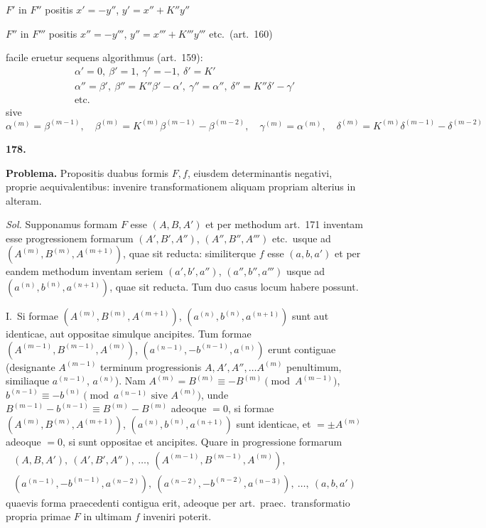 \documentclass[12pt,a4paper]{article}
\theoremstyle{plain}
\theoremstyle{definition}
\theoremstyle{remark}
\begin{document}
$F'$ in $F''$ positis $x'=-y''$, $y'=x''+K''y''$

$F''$ in $F'''$ positis $x''=-y'''$, $y''=x'''+K'''y'''$ etc.\ (art.\ 160)

facile eruetur sequens algorithmus (art.\ 159):
\begin{gather*}
\alpha'=0,\ \beta'=1,\ \gamma'=-1,\ \delta'=K'\\
\alpha''=\beta',\ \beta''=K''\beta'-\alpha',\ \gamma''=\alpha'',\ \delta''=K''\delta'-\gamma'\\
\text{etc.}
\end{gather*}
sive
\[\alpha^{(m)}=\beta^{(m-1)},\quad \beta^{(m)}=K^{(m)}\beta^{(m-1)}-\beta^{(m-2)},\quad \gamma^{(m)}=\alpha^{(m)},\quad \delta^{(m)}=K^{(m)}\delta^{(m-1)}-\delta^{(m-2)}\]

\textbf{178.}

\textbf{Problema.} Propositis duabus formis $F,f$, eiusdem determinantis negativi, proprie aequivalentibus: invenire transformationem aliquam propriam alterius in alteram.

\textit{Sol.} Supponamus formam $F$ esse $(A,B,A')$ et per methodum art.\ 171 inventam esse progressionem formarum $(A',B',A'')$, $(A'',B'',A''')$ etc.\ usque ad $(A^{(m)},B^{(m)},A^{(m+1)})$, quae sit reducta: similiterque $f$ esse $(a,b,a')$ et per eandem methodum inventam seriem $(a',b',a'')$, $(a'',b'',a''')$ usque ad $(a^{(n)},b^{(n)},a^{(n+1)})$, quae sit reducta. Tum duo casus locum habere possunt.

I.\ Si formae $(A^{(m)},B^{(m)},A^{(m+1)})$, $(a^{(n)},b^{(n)},a^{(n+1)})$ sunt aut identicae, aut oppositae simulque ancipites. Tum formae $(A^{(m-1)},B^{(m-1)},A^{(m)})$, $(a^{(n-1)},-b^{(n-1)},a^{(n)})$ erunt contiguae (designante $A^{(m-1)}$ terminum progressionis $A,A',A'',\ldots A^{(m)}$ penultimum, similiaque $a^{(n-1)}$, $a^{(n)}$). Nam $A^{(m)}=B^{(m)}\equiv -B^{(m)}\pmod{A^{(m-1)}}$, $b^{(n-1)}\equiv -b^{(n)}\pmod{a^{(n-1)}\text{ sive }A^{(m)}}$, unde $B^{(m-1)}-b^{(n-1)}\equiv B^{(m)}-B^{(m)}$ adeoque $=0$, si formae $(A^{(m)},B^{(m)},A^{(m+1)})$, $(a^{(n)},b^{(n)},a^{(n+1)})$ sunt identicae, et $=\pm A^{(m)}$ adeoque $=0$, si sunt oppositae et ancipites. Quare in progressione formarum
\begin{gather*}
(A,B,A'),\ (A',B',A''),\ \ldots,\ (A^{(m-1)},B^{(m-1)},A^{(m)}),\\
(a^{(n-1)},-b^{(n-1)},a^{(n-2)}),\ (a^{(n-2)},-b^{(n-2)},a^{(n-3)}),\ \ldots,\ (a,b,a')
\end{gather*}
quaevis forma praecedenti contigua erit, adeoque per art.\ praec.\ transformatio propria primae $F$ in ultimam $f$ inveniri poterit.
\end{document}
